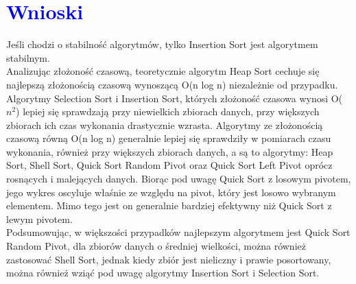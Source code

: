 \documentclass{article}
\begin{document}
\begin{figure}[H]
{
		}
	\end{figure}
	\section*{\textcolor{blue}{Wnioski}}
	Jeśli chodzi o stabilność algorytmów, tylko Insertion Sort jest algorytmem stabilnym. \\Analizując złożoność czasową, teoretycznie algorytm Heap Sort cechuje się najlepszą złożonością czasową wynoszącą O(n log n) niezależnie od przypadku. Algorytmy Selection Sort i Insertion Sort, których złożoność czasowa wynosi O($n^2$) lepiej się sprawdzają przy niewielkich zbiorach danych, przy większych zbiorach ich czas wykonania drastycznie wzrasta. Algorytmy ze złożonością czasową równą O(n log n) generalnie lepiej się sprawdziły w pomiarach czasu wykonania, również przy większych zbiorach danych, a są to algorytmy: Heap Sort, Shell Sort, Quick Sort Random Pivot oraz Quick Sort Left Pivot oprócz rosnących i malejących danych. Biorąc pod uwagę Quick Sort z losowym pivotem, jego wykres oscyluje właśnie ze względu na pivot, który jest losowo wybranym elementem. Mimo tego jest on generalnie bardziej efektywny niż Quick Sort z lewym pivotem. \\Podsumowując, w większości przypadków najlepszym algorytmem jest Quick Sort Random Pivot, dla zbiorów danych o średniej wielkości, można również zastosować Shell Sort, jednak kiedy zbiór jest nieliczny i prawie posortowany, można również wziąć pod uwagę algorytmy Insertion Sort i Selection Sort.
	
	
\end{document}
